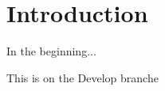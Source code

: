 \documentclass[11pt, a4paper, oneside]{book}
\begin{document}

\frontmatter

\tableofcontents
\mainmatter

\chapter{Introduction}

In the beginning...

This is on the Develop branche


\end{document}
